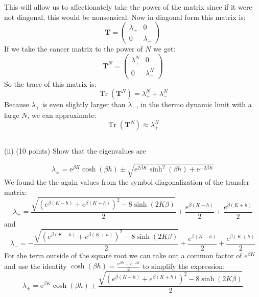 \documentclass[12pt]{article}
\begin{document}
This will allow us to affectionately take the power of the matrix since if it were not diagonal, this would be nonsensical. Now in diagonal form this matrix is:
\begin{equation}
\mathbf{T}=\left(\begin{array}{cc}
\lambda_{+} & 0 \\
0 & \lambda_{-}
\end{array}\right)
\end{equation}
If we take the cancer matrix to the power of $N$ we get:
\begin{equation}
\mathbf{T}^N=\left(\begin{array}{cc}
\lambda_{+}^N & 0 \\
0 & \lambda_{-}^N
\end{array}\right)
\end{equation}
So the trace of this matrix is:
\begin{equation}
\operatorname{Tr}\left(\mathbf{T}^{N}\right)=\lambda_{+}^{N}+\lambda_{-}^{N}
\end{equation}
Because $\lambda_{+}$ is even slightly larger than $\lambda_{-}$, in the thermo dynamic limit with a large $N$, we can approximate:
\begin{equation}
\operatorname{Tr}\left(\mathbf{T}^{N}\right)\approx\lambda_{+}^{N}
\end{equation}
\subsection{}

(ii) (10 points) Show that the eigenvalues are


\begin{equation*}
\lambda_{ \pm}=\mathrm{e}^{\beta K} \cosh (\beta h) \pm \sqrt{\mathrm{e}^{2 \beta K} \sinh ^{2}(\beta h)+\mathrm{e}^{-2 \beta K}} \tag{6}
\end{equation*}
We found the the again values from the symbol diagonalization of the transfer matrix:
\begin{equation}
  \lambda_{+} = \frac{\sqrt{\left(e^{\beta(K - h)} + e^{\beta(K + h)}\right)^2 - 8\sinh(2K\beta)}}{2} + \frac{e^{\beta(K - h)}}{2} + \frac{e^{\beta(K + h)}}{2}
\end{equation}
and
\begin{equation}
  \lambda_{-} = -\frac{\sqrt{\left(e^{\beta(K - h)} + e^{\beta(K + h)}\right)^2 - 8\sinh(2K\beta)}}{2} + \frac{e^{\beta(K - h)}}{2} + \frac{e^{\beta(K + h)}}{2}
\end{equation}
For the term outside of the square root we can take out a common factor of $e^{\beta K}$ and use the identity $\cosh(\beta h) = \frac{e^{\beta h} + e^{-\beta h}}{2}$ to simplify the expression:
\begin{equation}
\lambda_{ \pm}=\mathrm{e}^{\beta K} \cosh (\beta h) \pm \frac{\sqrt{\left(e^{\beta(K - h)} + e^{\beta(K + h)}\right)^2 - 8\sinh(2K\beta)}}{2}
\end{equation}
\end{document}
